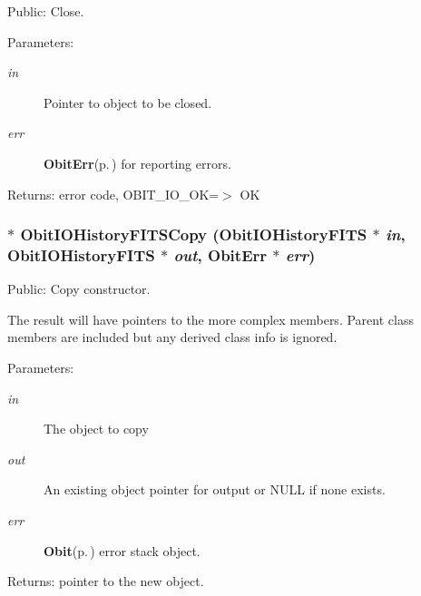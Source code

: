 Public: Close. 

\begin{Desc}
\item[Parameters:]
\begin{description}
\item[{\em in}]Pointer to object to be closed. \item[{\em err}]{\bf Obit\-Err}{\rm (p.\,\pageref{structObitErr})} for reporting errors. \end{description}
\end{Desc}
\begin{Desc}
\item[Returns:]error code, OBIT\_\-IO\_\-OK=$>$ OK \end{Desc}
\subsubsection{$\ast$ Obit\-IOHistory\-FITSCopy ({\bf Obit\-IOHistory\-FITS} $\ast$ {\em in}, {\bf Obit\-IOHistory\-FITS} $\ast$ {\em out}, {\bf Obit\-Err} $\ast$ {\em err})}\label{ObitIOHistoryFITS_8h_a10}


Public: Copy constructor. 

The result will have pointers to the more complex members. Parent class members are included but any derived class info is ignored. \begin{Desc}
\item[Parameters:]
\begin{description}
\item[{\em in}]The object to copy \item[{\em out}]An existing object pointer for output or NULL if none exists. \item[{\em err}]{\bf Obit}{\rm (p.\,\pageref{structObit})} error stack object. \end{description}
\end{Desc}
\begin{Desc}
\item[Returns:]pointer to the new object. \end{Desc}
